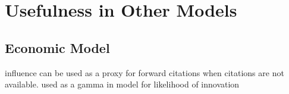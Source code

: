 
\chapter{Usefulness in Other Models} %

\label{Chapter7} %



\section{Economic Model}
influence can be used as a proxy for forward citations when citations are not available.
used as a gamma in model for likelihood of innovation


